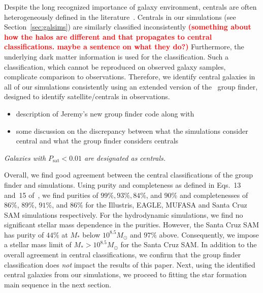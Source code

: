 \documentclass[preprint2,tighten]{aastex62}
\newcommand{\todo}[1]{{\bf \textcolor{red}{ #1}}}
\begin{document}
Despite the long recognized importance of galaxy environment, centrals 
are often heterogeneously defined in the 
literature~\citep[see][]{campbell2015}. Centrals in our 
simulations (see Section~\ref{sec:galsims}) are similarly classified 
inconsistently \todo{(something about how the halos are different and 
that propagates to central classifications. maybe a sentence on what they do?)} 
Furthermore, the underlying dark matter information is used for the 
classification. Such a classification, which cannot be reproduced on 
observed galaxy samples, complicate comparison to observations.
Therefore, we identify central galaxies in all of our simulations 
consistently using an extended version of the~\cite{tinker2011} group 
finder, designed to identify satellite/centrals in observations. 

\begin{itemize}
\item description of Jeremy's new group finder code along with 
\item some discussion on the discrepancy between what the simulations consider central and what the group finder considers centrals 
\end{itemize}
\emph{Galaxies with $P_\mathrm{sat} < 0.01$ are designated as centrals.} 

Overall, we find good agreement between the central classifications of 
the group finder and simulations. Using purity and completeness as defined 
in Eqs.~13 and~15 of~\cite{campbell2015}, we find purities of 
$99\%, 93\%, 84\%$, and $90\%$ and completenesses of $86\%$, $89\%$, 
$91\%$, and $86\%$  for the Illustris, EAGLE, MUFASA and Santa Cruz SAM 
simulations respectively. For the hydrodynamic simulations, we find no 
significant stellar mass dependence in the purities. However, the Santa 
Cruz SAM has purity of $44\%$ at $M_*$ below $10^{8.5}M_\odot$ and $97\%$ 
above. Consequently, we impose a stellar mass limit of $M_* > 10^{8.5} M_\odot$
for the Santa Cruz SAM. In addition to the overall agreement in central 
classifications, we confirm that the group finder classification does \emph{not} 
impact the results of this paper. Next, using the identified central 
galaxies from our simulations, we proceed to fitting the star formation 
main sequence in the next section.

\end{document}
